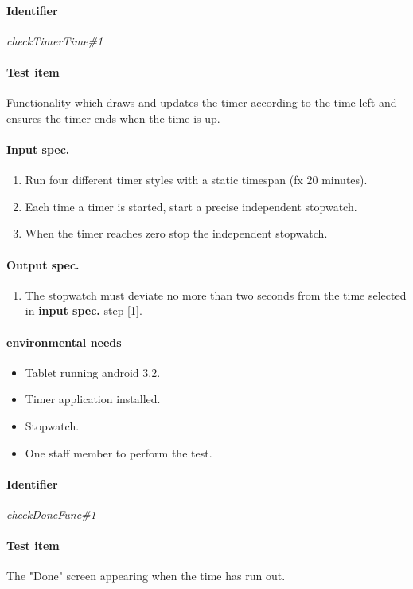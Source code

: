 \clearpage
\paragraph{Identifier}
	\textit{checkTimerTime\#1}
\paragraph{Test item}
	Functionality which draws and updates the timer according to the time left and ensures the timer ends when the time is up.
\paragraph{Input spec.}
	\begin{enumerate}
		\item Run four different timer styles with a static timespan (fx 20 minutes).
		\item Each time a timer is started, start a precise independent stopwatch.
		\item When the timer reaches zero stop the independent stopwatch.
	\end{enumerate}
\paragraph{Output spec.}
	\begin{enumerate}
		\item The stopwatch must deviate no more than two seconds from the time selected in \textbf{input spec.} step [1].
	\end{enumerate}
\paragraph{environmental needs}
	\begin{itemize}
		\item Tablet running android 3.2.
		\item Timer application installed.
		\item Stopwatch.
		\item One staff member to perform the test.
	\end{itemize}

\clearpage
\paragraph{Identifier}
	\textit{checkDoneFunc\#1}
\paragraph{Test item}
	The "Done" screen appearing when the time has run out.
